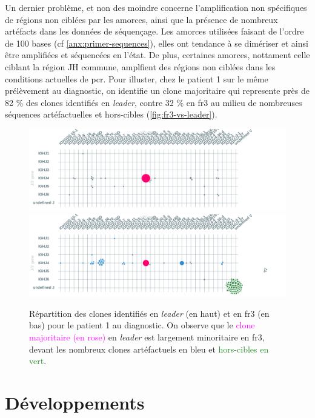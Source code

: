 Un dernier problème, et non des moindre concerne l'amplification non spécifiques de régions non ciblées par les amorces, 
ainsi que la présence de nombreux artéfacts dans les données de séquençage. Les amorces utilisées faisant de l'ordre de 100 bases 
(cf \autoref{anx:primer-sequences}), elles ont tendance à se dimériser et ainsi être amplifiées et séquencées en l'état. 
De plus, certaines amorces, nottament celle ciblant la région JH commune, amplfient des régions non ciblées dans 
les conditions actuelles de \gls{pcr}. Pour illuster, chez le patient 1 sur le même prélèvement au diagnostic, on identifie 
un clone majoritaire qui represente près de 82 \% des clones identifiés en \textit{leader}, contre 32 \% en \gls{fr}3 au milieu 
de nombreuses séquences artéfactuelles et hors-cibles (\autoref{fig:fr3-vs-leader}).

\begin{figure}[H]
    \centering
    \includegraphics[width=1\textwidth]{images/diag_leader.png}
    \vspace{0.5cm}
    \includegraphics[width=1\textwidth]{images/diag_fr3.png}
    \caption{
        Répartition des clones identifiés en \textit{leader} (en haut) et en \gls{fr}3 (en bas) 
        pour le patient 1 au diagnostic. On observe que le \textcolor{Magenta}{clone majoritaire (en rose)} 
        en \textit{leader} est largement minoritaire en \gls{fr}3, devant les \textcolor{ProcessBlue}{nombreux clones artéfactuels en bleu}  
        et \textcolor{ForestGreen}{hors-cibles en vert}.
    }
    \label{fig:fr3-vs-leader}
\end{figure}


\section{Développements}

